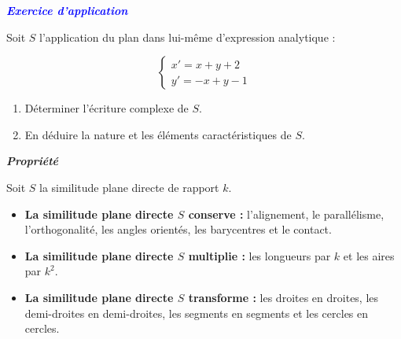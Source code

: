 \documentclass{article}
\begin{document}
\textbf{\textcolor{blue}{\textit{Exercice d’application}}}

\vspace{0.3cm}

Soit \( S \) l’application du plan dans lui-même d’expression analytique :

\[
\begin{cases}
x' = x + y + 2 \\
y' = -x + y - 1
\end{cases}
\]

\begin{enumerate}
    \item Déterminer l’écriture complexe de \( S \).
    
    \item En déduire la nature et les éléments caractéristiques de \( S \).
\end{enumerate}
\textbf{\textit{Propriété}}

\vspace{0.3cm}

Soit \( S \) la similitude plane directe de rapport \( k \).

\begin{itemize}
    \item \textbf{La similitude plane directe \( S \) conserve :} l’alignement, le parallélisme, l’orthogonalité, les angles orientés, les barycentres et le contact.
    
    \item \textbf{La similitude plane directe \( S \) multiplie :} les longueurs par \( k \) et les aires par \( k^2 \).
    
    \item \textbf{La similitude plane directe \( S \) transforme :} les droites en droites, les demi-droites en demi-droites, les segments en segments et les cercles en cercles.
\end{itemize}
\end{document}
